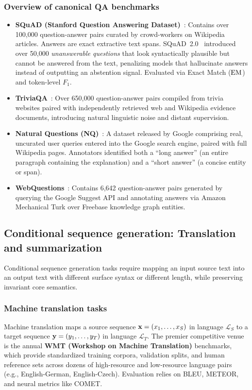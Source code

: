 \documentclass[../../main.tex]{subfiles}
\begin{document}
\subsubsection{Overview of canonical QA benchmarks}
\begin{itemize}
    \item \textbf{SQuAD (Stanford Question Answering Dataset)}~\cite{rajpurkar2016squad}: Contains over 100,000 question-answer pairs curated by crowd-workers on Wikipedia articles. Answers are exact extractive text spans. SQuAD~2.0~\cite{rajpurkar2018know} introduced over 50,000 \textit{unanswerable questions} that look syntactically plausible but cannot be answered from the text, penalizing models that hallucinate answers instead of outputting an abstention signal. Evaluated via Exact Match ($\mathrm{EM}$) and token-level $F_1$.
    \item \textbf{TriviaQA}~\cite{joshi2017triviaqa}: Over 650,000 question-answer pairs compiled from trivia websites paired with independently retrieved web and Wikipedia evidence documents, introducing natural linguistic noise and distant supervision.
    \item \textbf{Natural Questions (NQ)}~\cite{kwiatkowski2019natural}: A dataset released by Google comprising real, uncurated user queries entered into the Google search engine, paired with full Wikipedia pages. Annotators identified both a ``long answer'' (an entire paragraph containing the explanation) and a ``short answer'' (a concise entity or span).
    \item \textbf{WebQuestions}~\cite{berant2013webquestions}: Contains 6,642 question-answer pairs generated by querying the Google Suggest API and annotating answers via Amazon Mechanical Turk over Freebase knowledge graph entities.
\end{itemize}

\subsection{Conditional sequence generation: Translation and summarization}
\label{subsec:translation_summarization}

Conditional sequence generation tasks require mapping an input source text into an output text with different surface syntax or different length, while preserving invariant core semantics.

\subsubsection{Machine translation tasks}
Machine translation maps a source sequence $\mathbf{x} = (x_1, \dots, x_S)$ in language $\mathcal{L}_S$ to a target sequence $\mathbf{y} = (y_1, \dots, y_T)$ in language $\mathcal{L}_T$. The premier competitive venue is the annual \textbf{WMT (Workshop on Machine Translation)} benchmarks, which provide standardized training corpora, validation splits, and human reference sets across dozens of high-resource and low-resource language pairs (e.g., English-German, English-Czech). Evaluation relies on BLEU, METEOR, and neural metrics like COMET.
\end{document}
